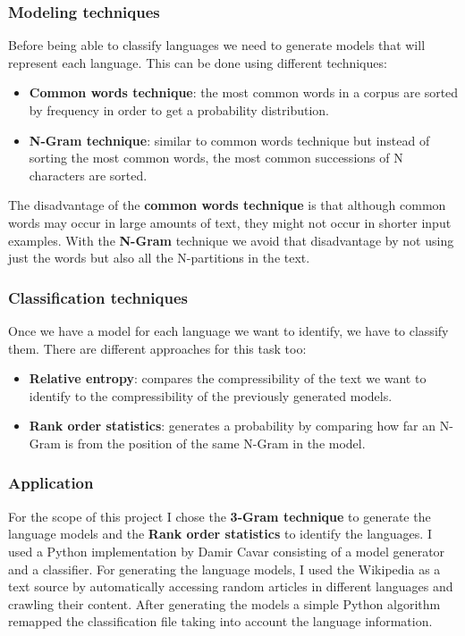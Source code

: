 \subsubsection{Modeling techniques}
Before being able to classify languages we need to generate models that will represent each language. This can be done using different techniques:
\begin{itemize}
  \item {\bf Common words technique}: the most common words in a corpus are sorted by frequency in order to get a probability distribution.
  \item {\bf N-Gram technique}: similar to common words technique but instead of sorting the most common words, the most common successions of N characters are sorted.
\end{itemize}  
The disadvantage of the {\bf common words technique} is that although common words may occur in large amounts of text, they might not occur in shorter input examples. With the {\bf N-Gram} technique 
we avoid that disadvantage by not using just the words but also all the N-partitions in the text.


\subsubsection{Classification techniques}
Once we have a model for each language we want to identify, we have to classify them. There are different approaches for this task too:
\begin{itemize}
  \item {\bf Relative entropy}: compares the compressibility of the text we want to identify to the compressibility of the previously generated models.
  \item {\bf Rank order statistics}: generates a probability by comparing how far an N-Gram is from the position of the same N-Gram in the model.
\end{itemize}
\subsubsection{Application}
For the scope of this project I chose the {\bf 3-Gram technique} to generate the language models and the {\bf Rank order statistics} to identify the languages. I used a Python implementation by Damir 
Cavar\cite{lid1} consisting of a model generator and a classifier.
For generating the language models, I used the Wikipedia as a text source by automatically accessing random articles in different languages and crawling their content. 
After generating the models a simple Python algorithm remapped the classification file taking into account the language information.


